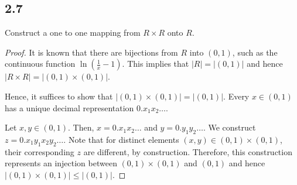 \subsection*{2.7} Construct a one to one mapping from $R \times R$ onto $R$.

\begin{proof}
    It is known that there are bijections from $R$ into $(0,1)$, such as the continuous function $\ln(\frac{1}{x} - 1)$. This implies that $|R| = |(0,1)|$ and hence $|R \times R| = |(0,1) \times (0,1)|$.

    Hence, it suffices to show that $|(0,1) \times (0,1)| = |(0,1)|$. Every $x \in (0,1)$ has a unique decimal representation $0.x_1x_2\dots $.

    Let $x,y \in (0,1)$. Then, $x=0.x_1x_2\dots $ and $y=0.y_1y_2\dots$. We construct $z = 0.x_1y_1x_2y_2\dots$. Note that for distinct elements $(x,y) \in (0,1) \times (0,1)$, their corresponding $z$ are different, by construction. Therefore, this construction represents an injection between $(0,1) \times (0,1)$ and $(0,1)$ and hence $|(0,1) \times (0,1)| \leq |(0,1)|$.

\end{proof}


